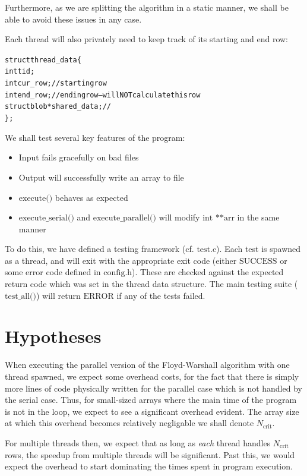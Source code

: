 \documentclass{article}
\newcommand{\ti}[1]{\emph{#1}}
\newcommand{\cpart}[1]{\newblock{\LARGE {\\\\#1}}}
\newcommand{\code}[1]{\texttt{$\text{#1}$}}
\begin{document}
Furthermore, as we are splitting the algorithm in a static manner, we shall be able to avoid these issues in any case.

Each thread will also privately need to keep track of its starting and end row:

\begin{alltt}
struct thread_data \{
        int tid;
        int cur_row;			// starting row
        int end_row;			// ending row -- will NOT calculate this row
        struct blob *shared_data;	// 
\};
\end{alltt}

\cpart{Testing}

We shall test several key features of the program:

\begin{itemize}
	\item Input fails gracefully on bad files
	\item Output will successfully write an array to file
	\item \code{execute()} behaves as expected
	\item \code{execute\_serial()} and \code{execute\_parallel()} will modify \code{int **arr} in the same manner
\end{itemize}

To do this, we have defined a testing framework (cf. \code{test.c}). Each test is spawned as a thread, and will exit with the appropriate exit code (either 
\code{SUCCESS} or some error code defined in \code{config.h}). These are checked against the expected return code which was set in the thread data structure. The 
main testing suite (\code{test\_all()}) will return \code{ERROR} if any of the tests failed.

\section{Hypotheses}

When executing the parallel version of the Floyd-Warshall algorithm with one thread spawned, we expect some overhead costs, for the fact that there is simply more 
lines of code physically written for the parallel case which is not handled by the serial case. Thus, for small-sized arrays where the main time of the program is 
not in the loop, we expect to see a significant overhead evident. The array size at which this overhead becomes relatively negligable we shall denote 
$N_\text{crit}$.

For multiple threads then, we expect that as long as \ti{each} thread handles $N_\text{crit}$ rows, the speedup from multiple threads will be significant. Past 
this, we would expect the overhead to start dominating the times spent in program execution.
\end{document}
